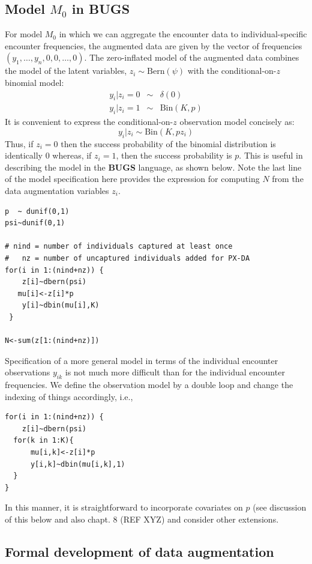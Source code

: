 \subsection{Model $M_0$ in BUGS}

For model $M_0$ in which we can aggregate the encounter data to
individual-specific encounter frequencies, the augmented data are
given by the vector of frequencies $(y_{1}, \ldots, y_{n}, 0, 0,
\ldots, 0)$. The zero-inflated model of the augmented data combines
the model of the latent variables, $z_{i} \sim \mbox{Bern}(\psi)$ with
the conditional-on-$z$ binomial model:
\begin{eqnarray*}
y_{i} | z_{i} = 0 &\sim& \delta(0) \\
y_{i}|z_{i} = 1   &\sim& \mbox{Bin}(K,p)
\end{eqnarray*}
It is convenient to express the conditional-on-$z$ observation model concisely as:
\[
 y_{i}|z_{i} \sim \mbox{Bin}(K, p z_{i})
\]
Thus, if $z_{i}=0$ then the success probability of the binomial
distribution is identically 0 whereas, if $z_{i}=1$, then the success
probability is $p$. This is useful in describing the model in the {\bf
  BUGS}
language, as shown below. Note the last line of the model
specification here provides the expression for computing $N$ from the
data augmentation variables $z_{i}$.
{\small
\begin{verbatim}
p  ~ dunif(0,1)
psi~dunif(0,1)

# nind = number of individuals captured at least once
#   nz = number of uncaptured individuals added for PX-DA
for(i in 1:(nind+nz)) {
    z[i]~dbern(psi)
   mu[i]<-z[i]*p
    y[i]~dbin(mu[i],K)
 }

N<-sum(z[1:(nind+nz)])
\end{verbatim}
}


Specification of a more general model in terms of the individual
encounter observations $y_{ik}$ is not much more difficult than for
the individual encounter frequencies.  We define the
observation model by a double loop and change the indexing of things
accordingly, i.e.,
\begin{verbatim}
for(i in 1:(nind+nz)) {
    z[i]~dbern(psi)
  for(k in 1:K){
      mu[i,k]<-z[i]*p
      y[i,k]~dbin(mu[i,k],1)
  } 
}
\end{verbatim}
In this manner, it is straightforward to incorporate covariates on $p$ 
(see discussion of this below and also chapt. 8 (REF XYZ) and consider 
other extensions.


\subsection{Formal development of data augmentation}

